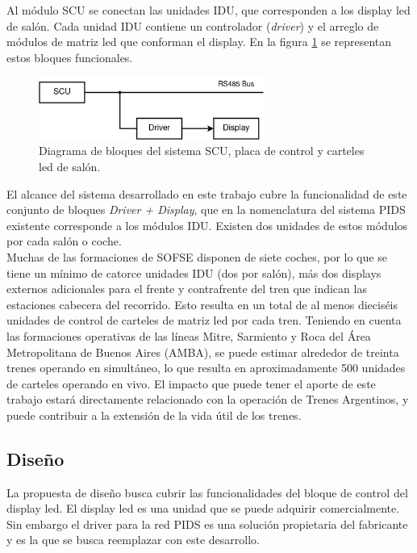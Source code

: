 Al módulo SCU se conectan las unidades IDU, que corresponden a los display led de salón. Cada unidad IDU contiene un controlador (\textit{driver}) y el arreglo de módulos de matriz led que conforman el display. En la figura \ref{fig:diagScuDriverDisplay} se representan estos bloques funcionales.\\


\begin{figure}[ht]
	\centering
	\includegraphics[width=0.66\textwidth]{./Figures/diagScuDriverDisplay.png}
	\caption{Diagrama de bloques del sistema SCU, placa de control y carteles led de salón.}
	\label{fig:diagScuDriverDisplay}
\end{figure}

El alcance del sistema desarrollado en este trabajo cubre la funcionalidad de este conjunto de bloques \textit{Driver + Display}, que en la nomenclatura del sistema PIDS existente corresponde a los módulos IDU. Existen dos unidades de estos módulos por cada salón o coche.\\

Muchas de las formaciones de SOFSE disponen de siete coches, por lo que se tiene un mínimo de catorce unidades IDU (dos por salón), más dos displays externos adicionales para el frente y contrafrente del tren que indican las estaciones cabecera del recorrido. Esto resulta en un total de al menos dieciséis unidades de control de carteles de matriz led por cada tren. Teniendo en cuenta las formaciones operativas de las líneas Mitre, Sarmiento y Roca del Área Metropolitana de Buenos Aires (AMBA), se puede estimar alrededor de treinta trenes operando en simultáneo, lo que resulta en aproximadamente 500 unidades de carteles operando en vivo. El impacto que puede tener el aporte de este trabajo estará directamente relacionado con la operación de Trenes Argentinos, y puede contribuir a la extensión de la vida útil de los trenes.\\

\subsection{Diseño}
La propuesta de diseño busca cubrir las funcionalidades del bloque de control del display led. El display led es una unidad que se puede adquirir comercialmente. Sin embargo el driver para la red PIDS es una solución propietaria del fabricante y es la que se busca reemplazar con este desarrollo.\\

